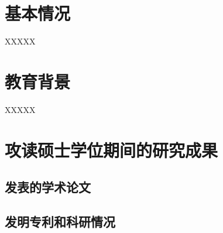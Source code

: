 \thesisintroduction
\section{基本情况}
XXXXX
\section{教育背景}

XXXXX

\section{攻读硕士学位期间的研究成果}
\subsection{发表的学术论文}

\subsection{发明专利和科研情况}
